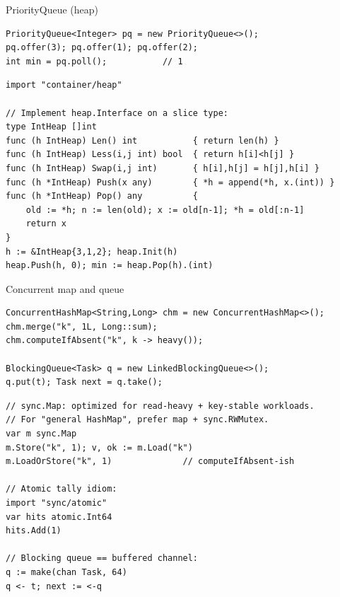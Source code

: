 \documentclass[10pt]{article}
\begin{document}
\begin{construct}{PriorityQueue (heap)}
\noindent
\begin{minipage}[t]{0.485\linewidth}
\begin{lstlisting}[style=java, title=Java]
PriorityQueue<Integer> pq = new PriorityQueue<>();
pq.offer(3); pq.offer(1); pq.offer(2);
int min = pq.poll();           // 1
\end{lstlisting}
\end{minipage}\hfill
\begin{minipage}[t]{0.485\linewidth}
\begin{lstlisting}[style=go, title=Go]
import "container/heap"

// Implement heap.Interface on a slice type:
type IntHeap []int
func (h IntHeap) Len() int           { return len(h) }
func (h IntHeap) Less(i,j int) bool  { return h[i]<h[j] }
func (h IntHeap) Swap(i,j int)       { h[i],h[j] = h[j],h[i] }
func (h *IntHeap) Push(x any)        { *h = append(*h, x.(int)) }
func (h *IntHeap) Pop() any          {
    old := *h; n := len(old); x := old[n-1]; *h = old[:n-1]
    return x
}
h := &IntHeap{3,1,2}; heap.Init(h)
heap.Push(h, 0); min := heap.Pop(h).(int)
\end{lstlisting}
\end{minipage}
\end{construct}


\begin{construct}{Concurrent map and queue}
\noindent
\begin{minipage}[t]{0.485\linewidth}
\begin{lstlisting}[style=java, title=Java]
ConcurrentHashMap<String,Long> chm = new ConcurrentHashMap<>();
chm.merge("k", 1L, Long::sum);
chm.computeIfAbsent("k", k -> heavy());

BlockingQueue<Task> q = new LinkedBlockingQueue<>();
q.put(t); Task next = q.take();
\end{lstlisting}
\end{minipage}\hfill
\begin{minipage}[t]{0.485\linewidth}
\begin{lstlisting}[style=go, title=Go]
// sync.Map: optimized for read-heavy + key-stable workloads.
// For "general HashMap", prefer map + sync.RWMutex.
var m sync.Map
m.Store("k", 1); v, ok := m.Load("k")
m.LoadOrStore("k", 1)              // computeIfAbsent-ish

// Atomic tally idiom:
import "sync/atomic"
var hits atomic.Int64
hits.Add(1)

// Blocking queue == buffered channel:
q := make(chan Task, 64)
q <- t; next := <-q
\end{lstlisting}
\end{minipage}
\end{construct}
\end{document}
